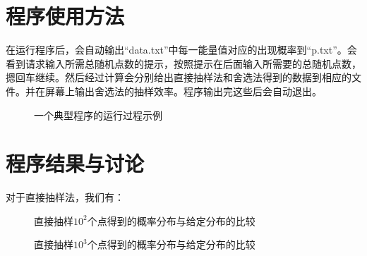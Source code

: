 \documentclass[a4paper,11pt]{article}
\begin{document}
\section{程序使用方法}
在运行程序后，会自动输出“data.txt”中每一能量值对应的出现概率到“p.txt”。会看到请求输入所需总随机点数的提示，按照提示在后面输入所需要的总随机点数，摁回车继续。然后经过计算会分别给出直接抽样法和舍选法得到的数据到相应的文件。并在屏幕上输出舍选法的抽样效率。程序输出完这些后会自动退出。

\begin{figure}[!htbp]        
\caption{\label{1} 一个典型程序的运行过程示例}      
\end{figure}


\section{程序结果与讨论}
对于直接抽样法，我们有：

\begin{figure}[!htbp]        
\caption{\label{1} 直接抽样$10^{2}$个点得到的概率分布与给定分布的比较}      
\end{figure}

\begin{figure}[!htbp]        
\caption{\label{1} 直接抽样$10^{3}$个点得到的概率分布与给定分布的比较}      
\end{figure}
\end{document}
